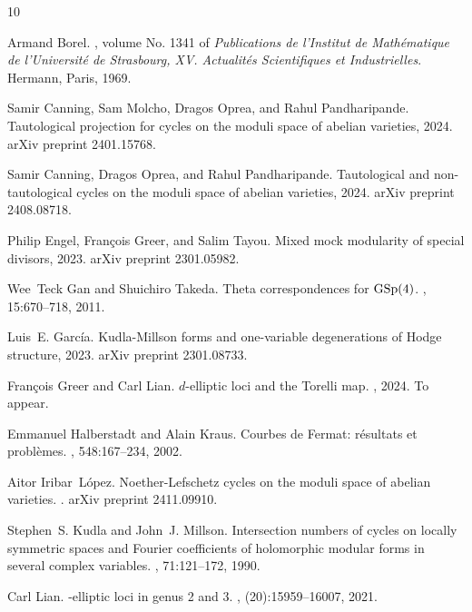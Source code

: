 \documentclass[12pt]{amsart}
\theoremstyle{definition}
\begin{document}
\begin{thebibliography}{10}

Armand Borel.
, volume No. 1341 of
  {\em Publications de l'Institut de Math\'ematique de l'Universit\'e{} de
  Strasbourg, XV. Actualit\'es Scientifiques et Industrielles}.
\newblock Hermann, Paris, 1969.

Samir Canning, Sam Molcho, Dragos Oprea, and Rahul Pandharipande.
\newblock Tautological projection for cycles on the moduli space of abelian
  varieties, 2024.
\newblock arXiv preprint 2401.15768.

Samir Canning, Dragos Oprea, and Rahul Pandharipande.
\newblock Tautological and non-tautological cycles on the moduli space of
  abelian varieties, 2024.
\newblock arXiv preprint 2408.08718.

Philip Engel, François Greer, and Salim Tayou.
\newblock Mixed mock modularity of special divisors, 2023.
\newblock arXiv preprint 2301.05982.

Wee~Teck Gan and Shuichiro Takeda.
\newblock Theta correspondences for {${\rm GSp}(4)$}.
, 15:670--718, 2011.

Luis~E. Garc\'{i}a.
\newblock Kudla-{M}illson forms and one-variable degenerations of {H}odge
  structure, 2023.
\newblock arXiv preprint 2301.08733.

François Greer and Carl Lian.
\newblock $d$-elliptic loci and the {T}orelli map.
, 2024.
\newblock To appear.

Emmanuel Halberstadt and Alain Kraus.
\newblock Courbes de {F}ermat: r\'esultats et probl\`emes.
, 548:167--234, 2002.

Aitor Iribar~L\'{o}pez.
\newblock Noether-{L}efschetz cycles on the moduli space of abelian varieties.
.
\newblock arXiv preprint 2411.09910.

Stephen~S. Kudla and John~J. Millson.
\newblock Intersection numbers of cycles on locally symmetric spaces and
  {F}ourier coefficients of holomorphic modular forms in several complex
  variables.
, 71:121--172, 1990.

Carl Lian.
-elliptic loci in genus 2 and 3.
, (20):15959--16007, 2021.


\end{thebibliography}
\end{document}
